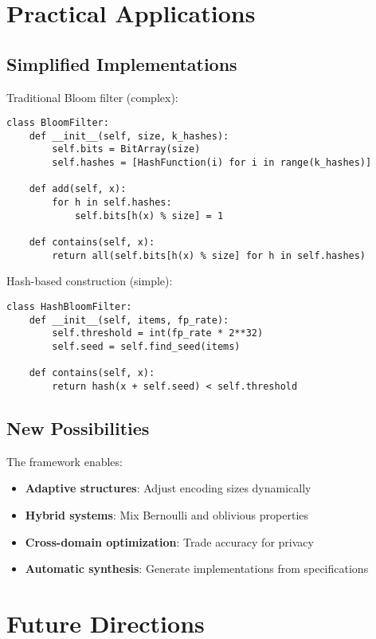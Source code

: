 \documentclass[11pt,final,hidelinks]{article}
\begin{document}
\section{Practical Applications}

\subsection{Simplified Implementations}

Traditional Bloom filter (complex):
\begin{verbatim}
class BloomFilter:
    def __init__(self, size, k_hashes):
        self.bits = BitArray(size)
        self.hashes = [HashFunction(i) for i in range(k_hashes)]
    
    def add(self, x):
        for h in self.hashes:
            self.bits[h(x) % size] = 1
            
    def contains(self, x):
        return all(self.bits[h(x) % size] for h in self.hashes)
\end{verbatim}

Hash-based construction (simple):
\begin{verbatim}
class HashBloomFilter:
    def __init__(self, items, fp_rate):
        self.threshold = int(fp_rate * 2**32)
        self.seed = self.find_seed(items)
    
    def contains(self, x):
        return hash(x + self.seed) < self.threshold
\end{verbatim}

\subsection{New Possibilities}

The framework enables:
\begin{itemize}
    \item \textbf{Adaptive structures}: Adjust encoding sizes dynamically
    \item \textbf{Hybrid systems}: Mix Bernoulli and oblivious properties
    \item \textbf{Cross-domain optimization}: Trade accuracy for privacy
    \item \textbf{Automatic synthesis}: Generate implementations from specifications
\end{itemize}

\section{Future Directions}
\end{document}
